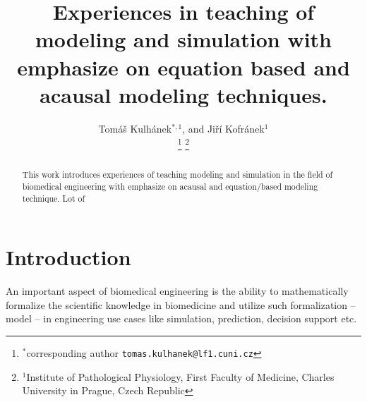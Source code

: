 \documentclass[letterpaper, 10 pt, conference]{ieeeconf}  %
\title{\LARGE \bf
Experiences in teaching of modeling and simulation with emphasize on equation based and acausal modeling techniques.
}
\author{\parbox{3 in}{
Tomáš Kulhánek$^{*,1}$, 
and Jiří Kofránek$^{1}$}%
\thanks{$^{*}$corresponding author {\tt\small tomas.kulhanek@lf1.cuni.cz}}%
\thanks{$^{1}$Institute of Pathological Physiology, First Faculty of Medicine, Charles University in Prague, Czech Republic}%
}
\begin{document}
\maketitle
\thispagestyle{empty}
\pagestyle{empty}


\begin{abstract}

This work introduces experiences of teaching modeling and simulation in the field of biomedical engineering with emphasize on acausal and equation/based modeling technique. Lot of 

\end{abstract}


\section{Introduction}
An important aspect of biomedical engineering is the ability to mathematically formalize the scientific knowledge in biomedicine and utilize such formalization -- model -- in engineering use cases like simulation, prediction, decision support etc. 
\end{document}
